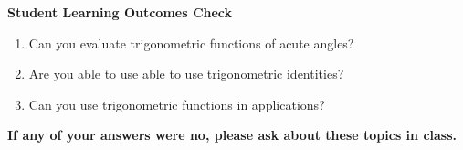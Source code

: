 \noindent \textbf{Student Learning Outcomes Check}

\begin{enumerate}
\item Can you evaluate trigonometric functions of acute angles?
\item Are you able to use able to use trigonometric identities?
\item Can you use trigonometric functions in applications?
\end{enumerate}

\noindent \textbf{If any of your answers were no, please ask about these topics in class.}

